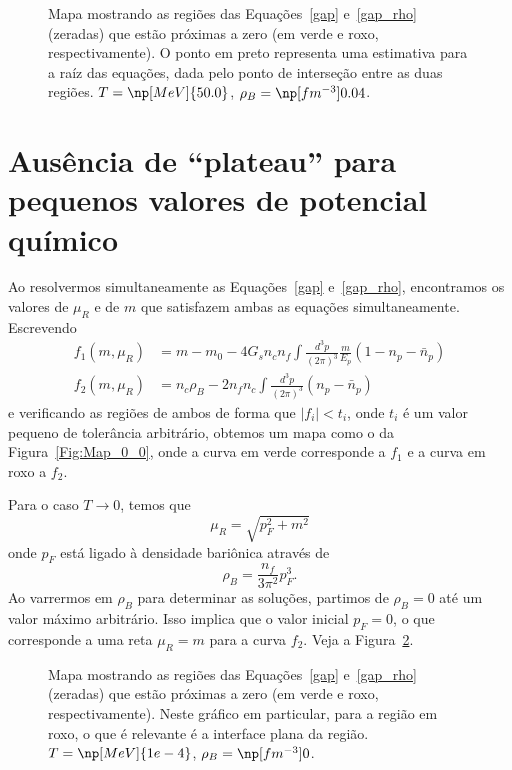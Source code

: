 \begin{figure}
	
	\caption{Mapa mostrando as regiões das Equações~\ref{gap} e~\ref{gap_rho} (zeradas) que estão próximas a zero (em verde e roxo, respectivamente). O ponto em preto representa uma estimativa para a raíz das equações, dada pelo ponto de interseção entre as duas regiões.  $T = \np[MeV]{50.0}$, $\rho_B = \np[fm^{-3}]{0.04}$.\protect}
	\label{Fig:Map_9_0}
\end{figure}

\FloatBarrier

\section{Ausência de ``plateau'' para pequenos valores de potencial químico}
\label{Sec:plateau}

Ao resolvermos simultaneamente as Equações~\ref{gap} e~\ref{gap_rho}, encontramos os valores de $\mu_R$ e de $m$ que satisfazem ambas as equações simultaneamente. Escrevendo
\begin{align}
	f_1(m, \mu_R) &= m - m_0 - 4G_s n_c n_f \int\frac{d^3p}{(2\pi)^3} \frac{m}{E_p}(1 - n_p - \bar{n}_p) \\
	f_2(m, \mu_R) &= n_c\rho_B - 2 n_fn_c\int\frac{d^3p}{(2\pi)^3}(n_p - \bar{n}_p)
\end{align}
%
e verificando as regiões de ambos de forma que $|f_i| < t_i$, onde $t_i$ é um valor pequeno de tolerância arbitrário, obtemos um mapa como o da Figura~\ref{Fig:Map_0_0}, onde a curva em verde corresponde a $f_1$ e a curva em roxo a $f_2$.

Para o caso $T \to 0$, temos que 
\begin{equation}
	\mu_R = \sqrt{p_F^2 + m^2}
\end{equation}
%
onde $p_F$ está ligado à densidade bariônica através de
\begin{equation}
	\rho_B = \frac{n_f}{3\pi^2}p_F^3.
\end{equation}
%
Ao varrermos em $\rho_B$ para determinar as soluções, partimos de $\rho_B = 0$ até um valor máximo arbitrário. Isso implica que o valor inicial $p_F = 0$, o que corresponde a uma reta $\mu_R = m$ para a curva $f_2$. Veja a Figura~\ref{Fig:Map_zero_temp_zero_dens}.

\begin{figure}
	
	\caption{Mapa mostrando as regiões das Equações~\ref{gap} e~\ref{gap_rho} (zeradas) que estão próximas a zero (em verde e roxo, respectivamente).  Neste gráfico em particular, para a região em roxo, o que é relevante é a interface plana da região. $T = \np[MeV]{1e-4}$, $\rho_B = \np[fm^{-3}]{0}$.\protect}
	\label{Fig:Map_zero_temp_zero_dens}
\end{figure}

